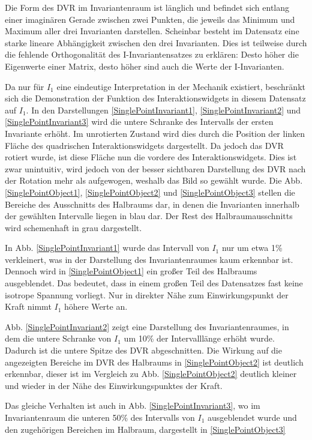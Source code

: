 \documentclass[a4paper,fontsize=12pt,toc=bib,halfparskip]{scrartcl}
\begin{document}
Die Form des DVR im Invariantenraum ist l\"anglich und befindet sich entlang einer imagin\"aren Gerade zwischen zwei Punkten, die jeweils das Minimum und Maximum aller drei Invarianten darstellen. Scheinbar besteht im Datensatz eine starke lineare Abh\"angigkeit zwischen den drei Invarianten. Dies ist teilweise durch die fehlende Orthogonalit\"at des I-Invariantensatzes zu erkl\"aren: Desto h\"oher die Eigenwerte einer Matrix, desto h\"oher sind auch die Werte der I-Invarianten.  

Da nur f\"ur $I_1$ eine eindeutige Interpretation in der Mechanik existiert, beschr\"ankt sich die Demonstration der Funktion des Interaktionswidgets in diesem Datensatz auf $I_1$. In den Darstellungen \ref{SinglePointInvariant1}, \ref{SinglePointInvariant2} und \ref{SinglePointInvariant3} wird die untere Schranke des Intervalls der ersten Invariante erh\"oht. Im unrotierten Zustand wird dies durch die Position der linken Fl\"ache des quadrischen Interaktionswidgets dargestellt. Da jedoch das DVR rotiert wurde, ist diese Fl\"ache nun die vordere des Interaktionswidgets. Dies ist zwar unintuitiv, wird jedoch von der besser sichtbaren Darstellung des DVR nach der Rotation mehr als aufgewogen, weshalb das Bild so gew\"ahlt wurde. Die Abb. \ref{SinglePointObject1}, \ref{SinglePointObject2} und \ref{SinglePointObject3} stellen die Bereiche des Ausschnitts des Halbraums dar, in denen die Invarianten innerhalb der gew\"ahlten Intervalle liegen in blau dar. Der Rest des Halbraumausschnitts wird schemenhaft in grau dargestellt.

In Abb. \ref{SinglePointInvariant1} wurde das Intervall von $I_1$ nur um etwa 1\% verkleinert, was in der Darstellung des Invariantenraumes kaum erkennbar ist. Dennoch wird in \ref{SinglePointObject1} ein gro{\ss}er Teil des Halbraums ausgeblendet. Das bedeutet, dass in einem gro{\ss}en Teil des Datensatzes fast keine isotrope Spannung vorliegt. Nur in direkter N\"ahe zum Einwirkungspunkt der Kraft nimmt $I_1$ h\"ohere Werte an. 

Abb. \ref{SinglePointInvariant2} zeigt eine Darstellung des Invariantenraumes, in dem die untere Schranke von $I_1$ um 10\% der Intervalll\"ange erh\"oht wurde. Dadurch ist die untere Spitze des DVR abgeschnitten. Die Wirkung auf die angezeigten Bereiche im DVR des Halbraums in \ref{SinglePointObject2} ist deutlich erkennbar, dieser ist im Vergleich zu Abb. \ref{SinglePointObject2} deutlich kleiner und wieder in der N\"ahe des Einwirkungspunktes der Kraft. 

Das gleiche Verhalten ist auch in Abb. \ref{SinglePointInvariant3}, wo im Invariantenraum die unteren 50\% des Intervalls von $I_1$ ausgeblendet wurde und den zugeh\"origen Bereichen im Halbraum, dargestellt in \ref{SinglePointObject3}
\end{document}
